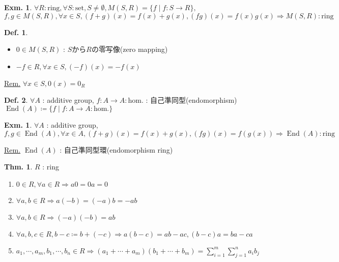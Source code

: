 \documentclass[uplatex,dvipdfmx,9pt]{beamer}
\newcommand{\End}[1]{\operatorname{End}(#1)}
\renewcommand{\hom}{\text{hom.}} %
\newcounter{textExmCount}
\theoremstyle{definition} %
\newtheorem{defn}{Def.}[subsection] %
\newtheorem{thm}{Thm.}[subsection] %
\theoremstyle{example}
\newtheorem{exmText}[textExmCount]{Exm.}
\begin{document}
      \begin{frame}

        \begin{exmText}
          $\forall R : \text{ring}, \forall S : \text{set}, S \ne \emptyset, M(S, R) = \{f \mid f\colon S \to R\},$ \\
          $f, g \in M(S, R), \forall x \in S, (f + g)(x) = f(x) + g(x), (fg)(x) = f(x)g(x) \Rightarrow M(S, R) : \text{ring}$
        \end{exmText}

        \begin{defn}
          \begin{itemize}
            \item $0 \in M(S, R)$ : $S$から$R$の\alert{零写像(zero mapping)}
            \item $-f \in R, \forall x \in S, (-f)(x) = -f(x)$
          \end{itemize}
        \end{defn}
        \underline{Rem.} $\forall x \in S, 0(x) = 0_R$

        \begin{defn}
          $\forall A$ : additive group, $f\colon A \to A : \hom$ : \alert{自己準同型(endomorphism)} \\
          $\End{A} \coloneqq \{f \mid f\colon A \to A : \hom \}$
        \end{defn}

        \begin{exmText}
          $\forall A$ : additive group, \\
          $f, g \in \End{A}, \forall x \in A, (f + g)(x) = f(x) + g(x), (fg)(x) = f(g(x)) \Rightarrow \End{A} : \text{ring}$
        \end{exmText}
        \underline{Rem.} $\End{A}$ : \alert{自己準同型環(endomorphism ring)}
        
      \end{frame}

      \begin{frame}

        \begin{thm}
          $R$ : ring
          \begin{enumerate}
            \item $0 \in R, \forall a \in R \Rightarrow a0 = 0a = 0$ 
            \item $\forall a, b \in R \Rightarrow a(-b) = (-a)b = -ab$
            \item $\forall a, b \in R \Rightarrow (-a)(-b) = ab$
            \item $\forall a, b, c \in R, b-c \coloneqq b+(-c) \Rightarrow a(b-c) = ab - ac, (b-c)a = ba - ca$
            \item $a_1, \cdots, a_m, b_1, \cdots, b_n \in R \Rightarrow (a_1 + \cdots + a_m)(b_1 + \cdots + b_m) = \displaystyle\sum_{i=1}^m\sum_{j=1}^n a_ib_j$
          \end{enumerate}
        \end{thm}
          
      \end{frame}
\end{document}
